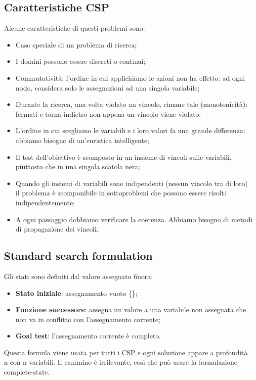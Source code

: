 \subsection{Caratteristiche CSP}
Alcune caratteristiche di questi problemi sono:
\begin{itemize}
    \item Caso speciale di un problema di ricerca;
    \item I domini possono essere discreti o continui;
    \item Commutatività: l'ordine in cui applichiamo le azioni non ha effetto: ad ogni nodo, considera solo le assegnazioni ad una singola variabile;
    \item Durante la ricerca, una volta violato un vincolo, rimane tale (monotonicità): fermati e torna indietro non appena un vincolo viene violato;
    \item L'ordine in cui scegliamo le variabili e i loro valori fa una grande differenza: abbiamo bisogno di un'euristica intelligente;
    \item Il test dell'obiettivo è scomposto in un insieme di vincoli sulle variabili, piuttosto che in una singola scatola nera;
    \item Quando gli insiemi di variabili sono indipendenti (nessun vincolo tra di loro) il problema è scomponibile in sottoproblemi che possono essere risolti indipendentemente;
    \item A ogni passaggio dobbiamo verificare la coerenza. Abbiamo bisogno di metodi di propagazione dei vincoli.
\end{itemize}

\subsection{Standard search formulation }
Gli stati sono definiti dal valore assegnato finora:
\begin{itemize}
    \item \textbf{Stato iniziale}: assegnamento vuoto \{\};
    \item \textbf{Funzione successore}: assegna un valore a una variabile non assegnata che non va in conflitto con l'assegnamento corrente;
    \item \textbf{Goal test}: l'assegnamento corrente è completo.
\end{itemize}
Questa formula viene usata per tutti i CSP e ogni soluzione appare a profondità n con n variabili. Il cammino è irrilevante, così che può usare la formulazione complete-state.



